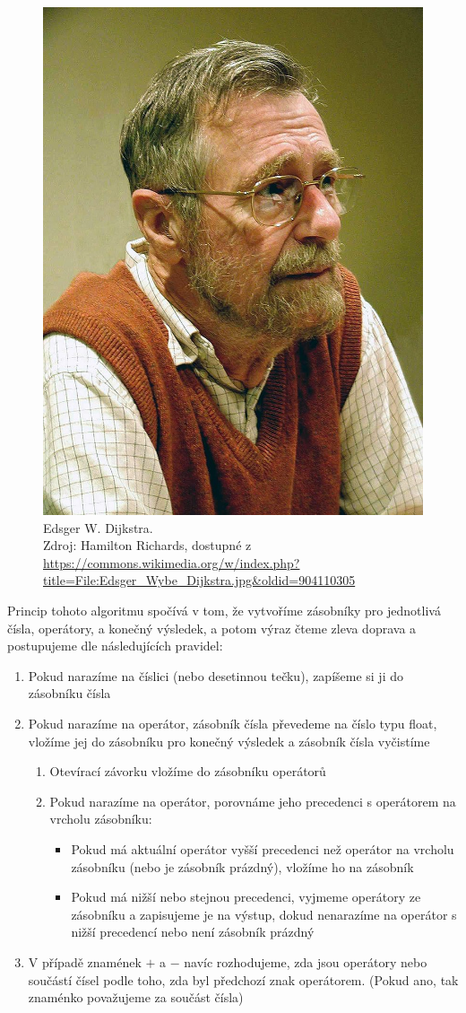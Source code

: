 \documentclass[12pt]{report}
\begin{document}
\begin{figure}
    \centering
    \includegraphics[width=0.4\linewidth]{800px-Edsger_Wybe_Dijkstra.jpg}
    \captionsetup{justification=centering}
    \caption[Edsger W. Dijkstra]{Edsger W. Dijkstra. \\
    Zdroj: Hamilton Richards, dostupné z \url{https://commons.wikimedia.org/w/index.php?title=File:Edsger_Wybe_Dijkstra.jpg&oldid=904110305} 
    } 
    \label{fig:enter-label}
\end{figure}

Princip tohoto algoritmu spočívá v tom, že vytvoříme zásobníky pro
jednotlivá čísla, operátory, a konečný výsledek, a potom výraz čteme
zleva doprava a postupujeme dle následujících pravidel: \supercite{geeksforgeeks_shutingYard}
\begin{enumerate}
	\item Pokud narazíme na číslici (nebo desetinnou tečku), zapíšeme si ji do
		zásobníku čísla

	\item Pokud narazíme na operátor, zásobník čísla převedeme na číslo typu float,
		vložíme jej do zásobníku pro konečný výsledek a zásobník čísla vyčistíme
		\begin{enumerate}
			\item Otevírací závorku vložíme do zásobníku operátorů

			\item Pokud narazíme na operátor, porovnáme jeho precedenci s operátorem
				na vrcholu zásobníku:
				\begin{itemize}
					\item Pokud má aktuální operátor vyšší precedenci než operátor na vrcholu
						zásobníku (nebo je zásobník prázdný), vložíme ho na zásobník

					\item Pokud má nižší nebo stejnou precedenci, vyjmeme operátory ze
						zásobníku a zapisujeme je na výstup, dokud nenarazíme na operátor s nižší
						precedencí nebo není zásobník prázdný
				\end{itemize}
		\end{enumerate}

	\item V případě znamének $+$ a $-$ navíc rozhodujeme, zda jsou operátory nebo
		součástí čísel podle toho, zda byl předchozí znak operátorem. (Pokud ano,
		tak znaménko považujeme za součást čísla)
\end{enumerate}
\end{document}
